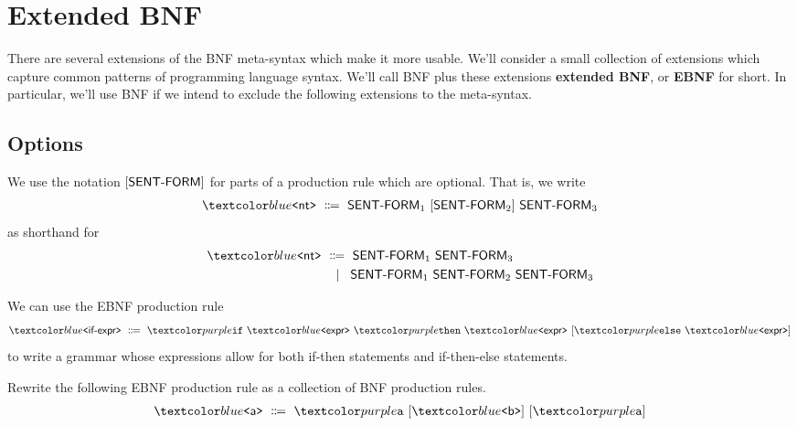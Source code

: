 \section{Extended BNF}

There are several extensions of the BNF meta-syntax which make it more usable.
We'll consider a small collection of extensions which capture common patterns of programming language syntax.
We'll call BNF plus these extensions \textbf{extended BNF}, or \textbf{EBNF} for short.
In particular, we'll use BNF if we intend to exclude the following extensions to the meta-syntax.

\subsection*{Options}

\begin{definition}
We use the notation ${[ \textsf{SENT-FORM} ]}$ for parts of a production rule which are optional.
That is, we write
\begin{align*}
  \bnfnt{nt} \bnfeq \textsf{SENT-FORM}_1 \ \bnfopt{\textsf{SENT-FORM}_2} \ \textsf{SENT-FORM}_3
\end{align*}
as shorthand for
\begin{align*}
  \bnfnt{nt} &\bnfeq \textsf{SENT-FORM}_1 \ \textsf{SENT-FORM}_3 \\
  &\bnfaltn \textsf{SENT-FORM}_1 \ \textsf{SENT-FORM}_2 \ \textsf{SENT-FORM}_3
\end{align*}
\end{definition}

\begin{example}
  We can use the EBNF production rule
  \begin{align*}
    \bnfnt{if-expr} \bnfeq
    \bnft{if} \ \bnfnt{expr} \
    \bnft{then} \ \bnfnt{expr} \
    \bnfopt{\bnft{else} \ \bnfnt{expr}}
  \end{align*}
  to write a grammar whose expressions allow for both if-then statements and if-then-else statements.
\end{example}

\begin{exercise}
  Rewrite the following EBNF production rule as a collection of BNF production rules.
  \begin{align*}
    \bnfnt{a} \bnfeq \bnft{a} \ \bnfopt{\bnfnt{b}} \ \bnfopt{\bnft{a}}
  \end{align*}
\end{exercise}

